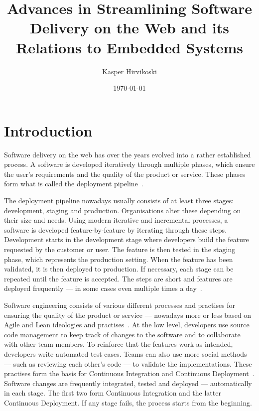\documentclass[english]{tktltiki2}
\title{Advances in Streamlining Software Delivery on the Web and its Relations to Embedded Systems}
\author{Kasper Hirvikoski}
\date{\today}
\begin{document}

\frontmatter

\maketitle
\setcounter{page}{2}
\makeabstract

\tableofcontents


\mainmatter


\section{Introduction}

Software delivery on the web has over the years evolved into a rather established process. A software is developed iteratively through multiple phases, which ensure the user’s requirements and the quality of the product or service. These phases form what is called the deployment pipeline~\cite{Fow06, HF11, Fow13a, Fow13b}.

The deployment pipeline nowadays usually consists of at least three stages: development, staging and production. Organisations alter these depending on their size and needs. Using modern iterative and incremental processes, a software is developed feature-by-feature by iterating through these steps. Development starts in the development stage where developers build the feature requested by the customer or user. The feature is then tested in the staging phase, which represents the production setting. When the feature has been validated, it is then deployed to production. If necessary, each stage can be repeated until the feature is accepted. The steps are short and features are deployed frequently — in some cases even multiple times a day~\cite{OR11, Sny13, Rub14}.

Software engineering consists of various different processes and practises for ensuring the quality of the product or service — nowadays more or less based on Agile and Lean ideologies and practises~\cite{Ono88, BBB01a, Fow05, Mon12}. At the low level, developers use source code management to keep track of changes to the software and to collaborate with other team members. To reinforce that the features work as intended, developers write automated test cases. Teams can also use more social methods — such as reviewing each other’s code — to validate the implementations. These practises form the basis for Continuous Integration and Continuous Deployment~\cite{Fow06, HF11, Fow13a, Fow13b}. Software changes are frequently integrated, tested and deployed — automatically in each stage. The first two form Continuous Integration and the latter Continuous Deployment. If any stage fails, the process starts from the beginning.
\end{document}
